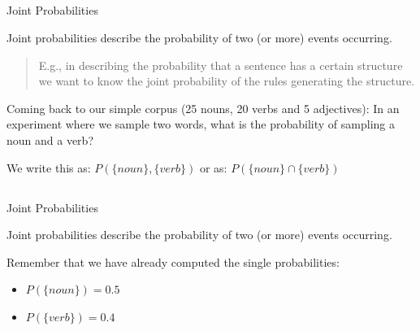 \documentclass[9pt,xcolor=pdftex,dvipsnames,table]{beamer}
\begin{document}
\subsection{}
\begin{frame}{Joint Probabilities}

{\large Joint probabilities describe the probability of two (or more) events occurring.}
\vspace{.5cm}

\begin{quotation}E.g., in describing the probability that a sentence has a certain structure we want to know the joint probability of the rules generating the structure.
\end{quotation}
\vspace{.25cm}

Coming back to our simple corpus (25 nouns, 20 verbs and 5 adjectives):
In an experiment where we sample two words, what is the probability of
sampling a noun and a verb?
\vspace{.25cm}

We write this as: $P(\{noun\}, \{verb\})$ or as: $P(\{noun\} \cap \{verb\})$\\
\end{frame}

\subsection{}
\begin{frame}{Joint Probabilities}

{\large Joint probabilities describe the probability of two (or more) events occurring.}
\vspace{.5cm}

Remember that we have already computed the single probabilities:

     \begin{itemize}
          \item $P(\{noun\}) = 0.5$
          \item $P(\{verb\}) = 0.4$
     \end{itemize}
\end{frame}
\end{document}

